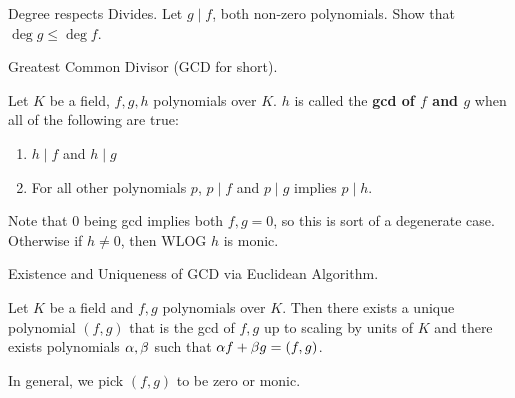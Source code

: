 \documentclass[../book.tex]{subfiles}
\begin{document}
\begin{ex} Degree respects Divides.
    Let $g \mid f$, both non-zero polynomials. Show that $\deg g \leq \deg f$. 
\end{ex}
\begin{dfn} Greatest Common Divisor (GCD for short). 

    Let $K$ be a field, $f, g, h$ polynomials over $K$. 
    $h$ is called the \textbf{gcd of $f$ and $g$} when all of the following are true:
    \begin{enumerate}
        \item $h \mid f$ and $h \mid g$
        \item For all other polynomials $p$, 
        $p \mid f$ and $p \mid g$ implies $p \mid h$.
    \end{enumerate}
    Note that $0$ being gcd implies both $f, g = 0$,
    so this is sort of a degenerate case. 
    Otherwise if $h \neq 0$, then WLOG $h$ is monic.
\end{dfn}
\begin{thm} Existence and Uniqueness of GCD via Euclidean Algorithm. 

    Let $K$ be a field and $f, g$ polynomials over $K$. 
    Then there exists a unique polynomial $(f,g)$ that is the gcd of $f, g$
    up to scaling by units of $K$ 
    and there exists polynomials $\alpha, \beta$ such that $\alpha f + \beta g = (f, g)$.
    
    In general, we pick $(f,g)$ to be zero or monic.
\end{thm}
\end{document}

